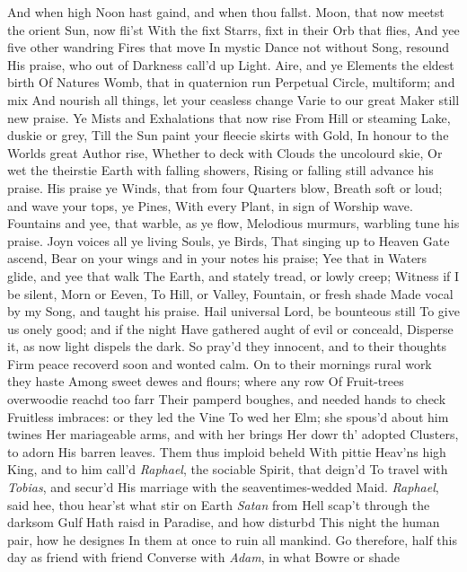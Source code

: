 \documentclass[11pt]{book}
\begin{document}
And when high Noon hast gaind, and when thou fallst. 
Moon, that now meetst the orient Sun, now fli'st 
With the fixt Starrs, fixt in their Orb that flies, 
And yee five other wandring Fires that move 
In mystic Dance not without Song, resound 
His praise, who out of Darkness call'd up Light. 
Aire, and ye Elements the eldest birth 
Of Natures Womb, that in quaternion run 
Perpetual Circle, multiform; and mix 
And nourish all things, let your ceasless change 
Varie to our great Maker still new praise. 
Ye Mists and Exhalations that now rise 
From Hill or steaming Lake, duskie or grey, 
Till the Sun paint your fleecie skirts with Gold, 
In honour to the Worlds great Author rise, 
Whether to deck with Clouds the uncolourd skie, 
Or wet the theirstie Earth with falling showers, 
Rising or falling still advance his praise. 
His praise ye Winds, that from four Quarters blow, 
Breath soft or loud; and wave your tops, ye Pines, 
With every Plant, in sign of Worship wave. 
Fountains and yee, that warble, as ye flow, 
Melodious murmurs, warbling tune his praise. 
Joyn voices all ye living Souls, ye Birds, 
That singing up to Heaven Gate ascend, 
Bear on your wings and in your notes his praise; 
Yee that in Waters glide, and yee that walk 
The Earth, and stately tread, or lowly creep; 
Witness if I be silent, Morn or Eeven, 
To Hill, or Valley, Fountain, or fresh shade 
Made vocal by my Song, and taught his praise. 
Hail universal Lord, be bounteous still 
To give us onely good; and if the night 
Have gathered aught of evil or conceald, 
Disperse it, as now light dispels the dark. 
\quad So pray'd they innocent, and to their thoughts 
Firm peace recoverd soon and wonted calm. 
On to their mornings rural work they haste 
Among sweet dewes and flours; where any row 
Of Fruit-trees overwoodie reachd too farr 
Their pamperd boughes, and needed hands to check 
Fruitless imbraces: or they led the Vine 
To wed her Elm; she spous'd about him twines 
Her mariageable arms, and with her brings 
Her dowr th' adopted Clusters, to adorn 
His barren leaves.  Them thus imploid beheld 
With pittie Heav'ns high King, and to him call'd 
\textit{Raphael}, the sociable Spirit, that deign'd 
To travel with \textit{Tobias}, and secur'd 
His marriage with the seaventimes-wedded Maid. 
\quad \textit{Raphael}, said hee, thou hear'st what stir on Earth 
\textit{Satan} from Hell scap't through the darksom Gulf 
Hath raisd in Paradise, and how disturbd 
This night the human pair, how he designes 
In them at once to ruin all mankind. 
Go therefore, half this day as friend with friend 
Converse with \textit{Adam}, in what Bowre or shade 
\end{document}

